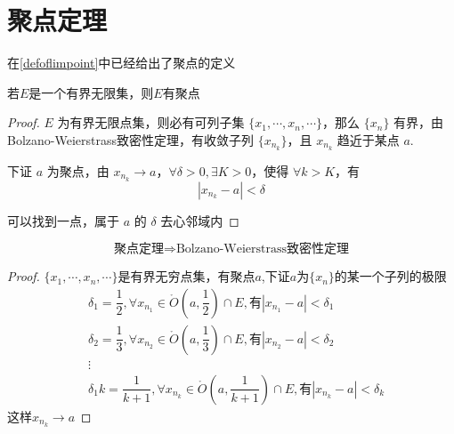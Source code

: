 \section{聚点定理}
在\ref{defoflimpoint}中已经给出了聚点的定义
\begin{theorem}
	若$E$是一个有界无限集，则$E$有聚点
\end{theorem}
\begin{proof}
	$E$ 为有界无限点集，则必有可列子集 $\{x_1, \cdots, x_n, \cdots\}$，那么 $\{x_n\}$ 有界，由Bolzano-Weierstrass致密性定理，有收敛子列 $\{x_{n_k}\}$，且 $x_{n_k}$ 趋近于某点 $a$.
	
	下证 $a$ 为聚点，由 $x_{n_k} \to a$，$\forall \delta > 0, \exists K > 0$，使得 $\forall k > K$，有
	\[
	|x_{n_k} - a| < \delta
	\]
	
	可以找到一点，属于 $a$ 的 $\delta$ 去心邻域内
\end{proof}
\begin{proposition}
	$$\text{聚点定理}\Rightarrow\text{Bolzano-Weierstrass致密性定理}$$
\end{proposition}
\begin{proof}
	$\{x_1, \cdots, x_n, \cdots\}$是有界无穷点集，有聚点$a$,下证$a$为$\{x_n\}$的某一个子列的极限
	\[\begin{aligned}
		&\delta_1=\dfrac{1}{2},\forall x_{n_1}\in\mathring{O}(a,\dfrac{1}{2})\cap E,\textbf{有}|x_{n_1}-a|<\delta_1\\
		&\delta_2=\dfrac{1}{3},\forall x_{n_2}\in\mathring{O}(a,\dfrac{1}{3})\cap E,\textbf{有}|x_{n_2}-a|<\delta_2\\
		&\vdots\\
		&\delta_1k=\dfrac{1}{k+1},\forall x_{n_k}\in\mathring{O}(a,\dfrac{1}{k+1})\cap E,\textbf{有}|x_{n_k}-a|<\delta_k
	\end{aligned}\]
	这样$x_{ n_k}\to a$
\end{proof}
